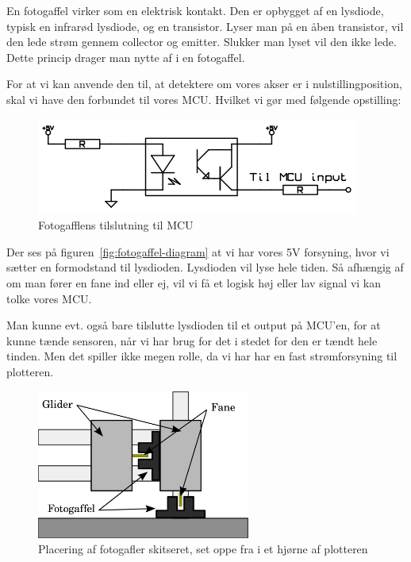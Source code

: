 En fotogaffel virker som en elektrisk kontakt. Den er opbygget af en
lysdiode, typisk en infrarød lysdiode, og en transistor. Lyser man på
en åben transistor, vil den lede strøm gennem collector og
emitter. Slukker man lyset vil den ikke lede. Dette princip drager man
nytte af i en fotogaffel.

For at vi kan anvende den til, at detektere om vores akser er i
nulstillingposition, skal vi have den forbundet til vores MCU. Hvilket
vi gør med følgende opstilling:

\begin{figure}[htbp]
  \centering
  \includegraphics{./img/fotogaffel-diagram}
  \caption{Fotogafflens tilslutning til MCU}
  \label{fig:fotogaffel-diagram}
\end{figure}

Der ses på figuren~\vref{fig:fotogaffel-diagram} at vi har vores 5V
forsyning, hvor vi sætter en formodstand til lysdioden. Lysdioden vil
lyse hele tiden. Så afhængig af om man fører en fane ind eller ej, vil
vi få et logisk høj eller lav signal vi kan tolke vores MCU.

Man kunne evt. også bare tilslutte lysdioden til et output på MCU'en,
for at kunne tænde sensoren, når vi har brug for det i stedet for den
er tændt hele tinden. Men det spiller ikke megen rolle, da vi har har
en fast strømforsyning til plotteren.

\begin{figure}[htbp]
  \centering
  \includegraphics[width=7cm]{./img/fotogafel-skitse}
  \caption{Placering af fotogafler skitseret, set oppe fra i
    et hjørne af plotteren}
  \label{fig:fotogaffel-skitse}
\end{figure}

